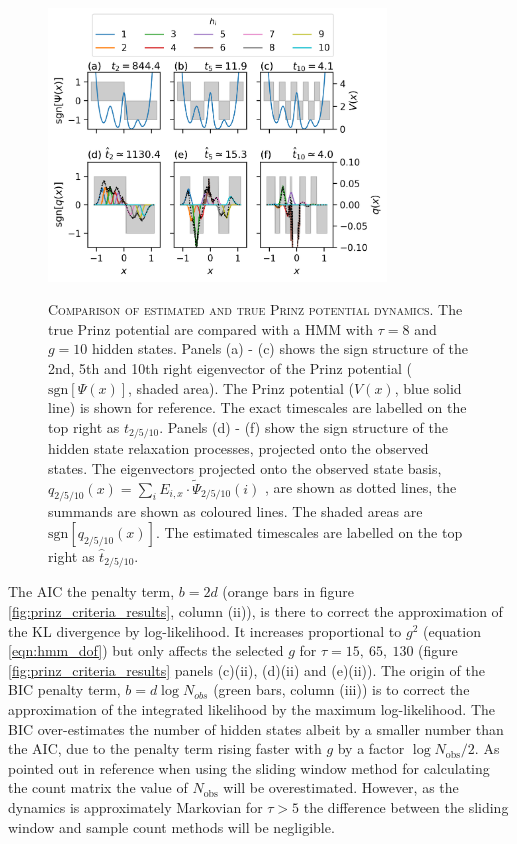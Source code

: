 \begin{figure}
    \centering
    \caption[Comparison of estimated and true Prinz potential dynamics]{\textsc{Comparison of estimated and true Prinz potential dynamics}. The true Prinz potential are compared with a HMM with $\tau=8$ and $g=10$ hidden states. Panels (a) - (c) shows the sign structure of the 2nd, 5th and 10th right eigenvector of the Prinz potential ($\mathrm{sgn}[\Psi(x)]$, shaded area). The Prinz potential ($V(x)$, blue solid line) is shown for reference. The exact timescales are labelled on the top right as $t_{2/5/10}$.  Panels (d) - (f) show the sign structure of the hidden state relaxation processes, projected onto the observed states. The eigenvectors projected onto the observed state basis, $q_{2/5/10}(x) = \sum_{i} E_{i, x} \cdot \tilde{\Psi}_{2/5/10}(i)$ , are shown as dotted lines, the summands are shown as coloured lines. The shaded areas are $\mathrm{sgn}[q_{2/5/10}(x)]$. The estimated timescales are labelled on the top right as $\hat{t}_{2/5/10}$. }
    \includegraphics[width=0.8\textwidth]{chapters/hmm_selection/figures/hmm_tau_8_g_10.png}
    \label{fig:prinz_tau8_g10}
\end{figure}

The AIC the penalty term, $b=2d$ (orange bars in figure \ref{fig:prinz_criteria_results}, column (ii)), is there to correct the approximation of the KL divergence by log-likelihood. It increases proportional to $g^{2}$ (equation \ref{eqn:hmm_dof}) but only affects the selected $g$ for $\tau=15,\ 65,\ 130$ (figure \ref{fig:prinz_criteria_results} panels (c)(ii), (d)(ii) and (e)(ii)). The origin of the BIC penalty term, $b=d\log{N_{obs}}$ (green bars, column (iii)) is to correct the approximation of the integrated likelihood by the maximum log-likelihood. The BIC over-estimates the number of hidden states albeit by a smaller number than the AIC, due to the penalty term rising faster with $g$ by a factor $\log{N_{\mathrm{obs}}}/2$. As pointed out in reference \cite{mcgibbonStatisticalModelSelection2014a} when using the sliding window method for calculating the count matrix the value of $N_{\mathrm{obs}}$  will be overestimated. However, as the dynamics is approximately Markovian for $\tau > 5$ the difference between the sliding window and sample count methods will be negligible. 

